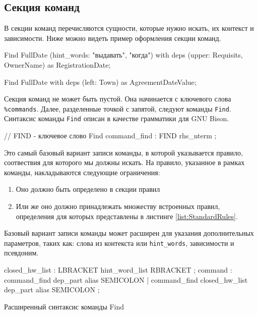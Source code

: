 \subsection{Секция команд}
В секции команд перечисляются сущности, которые нужно искать, их контекст и зависимости. Ниже можно видеть пример оформления секции команд.
\begin{Verb}
Find FullDate (hint_words: "выдавать", "когда") 
with deps (upper: Requisits, OwnerName) 
as RegistrationDate;

Find FullDate with deps (left: Town) as AgreementDateValue;
\end{Verb}
Секция команд не может быть пустой. Она начинается с ключевого слова \lstinline{%commands}. Далее, разделенные точкой с запятой, следуют команды \lstinline{Find}. Синтаксис команды \lstinline{Find} описан в качестве грамматики для GNU Bison.
\begin{Verb}
// FIND - ключевое слово Find
command_find
    : FIND rhs_nterm
    ;
\end{Verb}
Это самый базовый вариант записи команды, в которой указывается правило, соотвествия для которого мы должны искать. На правило, указанное в рамках команды, накладываются следующие ограничения:
\begin{enumerate}
  \item Оно должно быть определено в секции правил
  \item Или же оно должно принадлежать множеству встроенных правил, определения для которых представлены в листинге \ref{list:StandardRules}.
\end{enumerate}

Базовый вариант записи команды может расширен для указания дополнительных параметров, таких как: слова из контекста или \lstinline{hint_words}, зависимости и псевдоним.
\begin{ListingEnv}
\begin{Verb}
closed_hw_list
    : LBRACKET hint_word_list RBRACKET
    ;
command
    : command_find dep_part alias SEMICOLON
    | command_find closed_hw_list dep_part alias SEMICOLON
    ;
\end{Verb}
\caption{Расширенный синтаксис команды Find}
\label{list:FindExtSyntax}
\end{ListingEnv}

